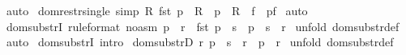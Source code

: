 \begin{isabellebody}
%
\isadelimproof
%
\endisadelimproof
%
\isatagproof
{}\isamarkupfalse%
\ auto\isanewline
{}\isamarkupfalse%
%
\endisatagproof
{\isafoldproof}%
%
\isadelimproof
\isanewline
%
\endisadelimproof
\isanewline
\isanewline
\isanewline
{}\isamarkupfalse%
\ dom{\isacharunderscore}restr{\isacharunderscore}single\ {\isacharbrackleft}simp{\isacharbrackright}{\isacharcolon}\ {\isachardoublequoteopen}{\isacharbang}{\isacharbang}R{\isachardot}\ fst\ p\ {\isacharcolon}\ R\ {\isacharequal}{\isacharequal}{\isachargreater}\ p\ {\isacharcolon}\ R\ {\isacharless}{\isacharcolon}\ f\ {\isacharequal}\ {\isacharparenleft}p{\isacharcolon}f{\isacharparenright}{\isachardoublequoteclose}\isanewline
%
\isadelimproof
%
\endisadelimproof
%
\isatagproof
{}\isamarkupfalse%
\ auto\isanewline
{}\isamarkupfalse%
%
\endisatagproof
{\isafoldproof}%
%
\isadelimproof
%
\endisadelimproof
%
\isamarkuptrue%
\isamarkupfalse%
\ dom{\isacharunderscore}substrI\ {\isacharbrackleft}rule{\isacharunderscore}format\ {\isacharparenleft}no{\isacharunderscore}asm{\isacharparenright}{\isacharbrackright}{\isacharcolon}\ {\isachardoublequoteopen}p\ {\isacharcolon}\ r\ {\isacharminus}{\isacharminus}{\isachargreater}\ fst\ p\ {\isachartilde}{\isacharcolon}\ s\ {\isacharminus}{\isacharminus}{\isachargreater}\ p\ {\isacharcolon}\ {\isacharparenleft}s\ {\isacharless}{\isacharminus}{\isacharcolon}\ r{\isacharparenright}{\isachardoublequoteclose}\isanewline
%
\isadelimproof
%
\endisadelimproof
%
\isatagproof
{}\isamarkupfalse%
\ {\isacharparenleft}unfold\ dom{\isacharunderscore}substr{\isacharunderscore}def{\isacharparenright}\isanewline
{}\isamarkupfalse%
\ auto\isanewline
{}\isamarkupfalse%
%
\endisatagproof
{\isafoldproof}%
%
\isadelimproof
\isanewline
%
\endisadelimproof
{}\isamarkupfalse%
\ dom{\isacharunderscore}substrI\ {\isacharbrackleft}intro{\isacharbang}{\isacharbrackright}\isanewline
\isanewline
{}\isamarkupfalse%
\ dom{\isacharunderscore}substrD{}{\isacharcolon}\ {\isachardoublequoteopen}{\isacharbang}{\isacharbang}r{\isachardot}\ p\ {\isacharcolon}\ {\isacharparenleft}s\ {\isacharless}{\isacharminus}{\isacharcolon}\ r{\isacharparenright}\ {\isacharequal}{\isacharequal}{\isachargreater}\ p\ {\isacharcolon}\ r{\isachardoublequoteclose}\isanewline
%
\isadelimproof
%
\endisadelimproof
%
\isatagproof
{}\isamarkupfalse%
\ {\isacharparenleft}unfold\ dom{\isacharunderscore}substr{\isacharunderscore}def{\isacharparenright}\isanewline

\end{isabellebody}
